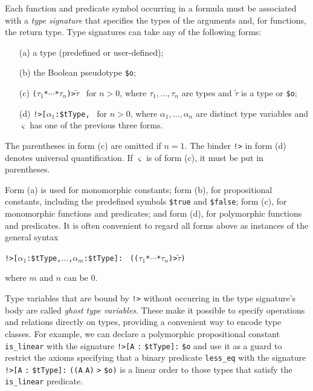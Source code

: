Each function and predicate symbol occurring in a formula must be associated
with a {\em type signature\/} that specifies the types of the arguments and, for
functions, the return type. Type signatures can take any of the following forms:
%
\begin{enumerate}
\item[(a)] a type (predefined or user-defined);
\item[(b)] the Boolean pseudotype {\tt \$o}; %
\pagebreak[2] %
\item[(c)] {\tt ($\tau_1$\;*\;${\cdots}$\;*\;$\tau_n$)\;>\;$\tilde \tau$}
\ for $n > 0$, where $\tau_1,\dots,\tau_n$ are types and $\tilde \tau$ is
a type or {\tt \$o};
\item[(d)] {\tt !>[$\alpha_1$\;:\;\$tType,}\;{\tt ${\dots}$,}\;{\tt
$\alpha_n$\;:\;\$tType]:\;$\varsigma$}
\ for $n > 0$, where $\alpha_1,\dots,\alpha_n$ are distinct
type variables and $\varsigma$ has one of the previous three forms.
\end{enumerate}
%
The parentheses in form (c) are omitted if $n = 1$.
The binder {\tt !>} in form (d) denotes universal quantification.
If $\varsigma$ is of form (c), it must be put in parentheses.

Form (a) is used for monomorphic constants; form (b), for
propositional constants, including the predefined symbols {\tt \$true} and
{\tt \$false}; form (c), for monomorphic functions and predicates;
and form (d), for polymorphic functions and predicates. It is often
convenient to regard all forms above as instances of the general syntax
\begin{center}
{\tt !>[$\alpha_1$\;:\;\$tType,\;${\dots}$,\;$\alpha_m$\;:\;\$tType]:} {\tt
(($\tau_1$\;*\;${\cdots}$\;*\;$\tau_n$)\;>\;$\tilde \tau$)}
\end{center}
where $m$ and $n$ can be 0. %

Type variables that are bound by {\tt !>} without
occurring in the type signature's body are called \emph{ghost type variables}.
These make it possible to specify operations and relations directly on types,
providing a convenient way to encode type classes.
For example, we can declare a polymorphic propositional
constant {\tt is\_linear} with the signature
{\tt !>[A} {\tt :} {\tt \$tType]:} {\tt \$o} and use it as a guard to restrict the
axioms specifying that a binary predicate {\tt less\_eq} with the signature
{\tt !>[A} {\tt :} {\tt \$tType]:} {\tt ((A} {\tt *} {\tt A)} {\tt >} {\tt \$o)}
is a linear order to those types that satisfy the {\tt is\_linear} predicate.

